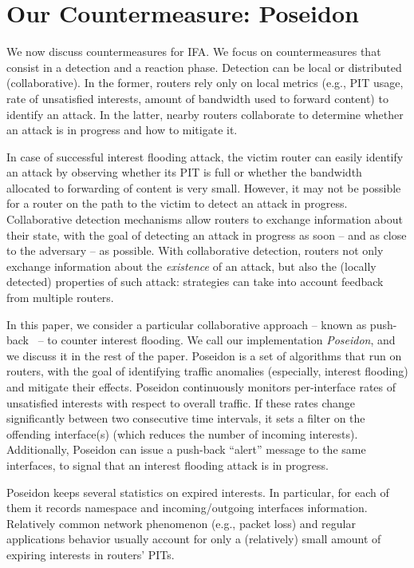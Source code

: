 \documentclass[10pt,conference,letterpaper]{IEEEtran}
\begin{document}
\section{Our Countermeasure: Poseidon}
\label{sec:reactive}
We now discuss countermeasures for IFA. We focus on countermeasures that consist in a detection and a reaction phase. Detection can be local or distributed (collaborative). In the former, routers 
rely only on local metrics (e.g., PIT usage, rate of unsatisfied interests, amount of 
bandwidth used to forward content) to identify an attack. In the latter, nearby 
routers collaborate to determine whether an attack is in progress and how to mitigate it. 

In case of successful interest flooding attack, the victim router can easily identify an attack by observing 
whether its PIT is full or whether the bandwidth allocated to forwarding of content is 
very small. However, it may not be possible for a router on the path to the victim to 
detect an attack in progress. 
Collaborative detection mechanisms allow routers to exchange information about their 
state, with the goal of detecting an attack in progress as soon -- and as close to the adversary -- as possible.
With collaborative detection, routers not only exchange 
information about the {\em existence} of an attack, but also the (locally detected) 
properties of such attack: strategies can take into account feedback from multiple routers.

In this paper, we consider a particular  collaborative approach -- known as 
push-back~\cite{ndn-dos} -- to counter interest flooding. 
We call our implementation {\em Poseidon}, and we discuss it in the rest of the paper.
Poseidon is a set of algorithms that run on routers, with the goal of identifying traffic 
anomalies (especially,  interest flooding) and mitigate their effects.
Poseidon continuously monitors per-interface rates of unsatisfied interests with respect 
to overall traffic. If these rates change significantly between two consecutive time intervals, it 
sets a filter on the offending interface(s) (which reduces the number of incoming 
interests). Additionally, Poseidon can issue a push-back ``alert'' message to the 
same interfaces, to signal that an interest flooding attack is in progress.


Poseidon keeps several statistics on expired interests. In particular, for each of them it 
records namespace and incoming/outgoing interfaces information. 
Relatively common network phenomenon (e.g., packet loss) and regular applications behavior 
usually account for only a (relatively) small amount of expiring interests in routers' PITs.
\end{document}

